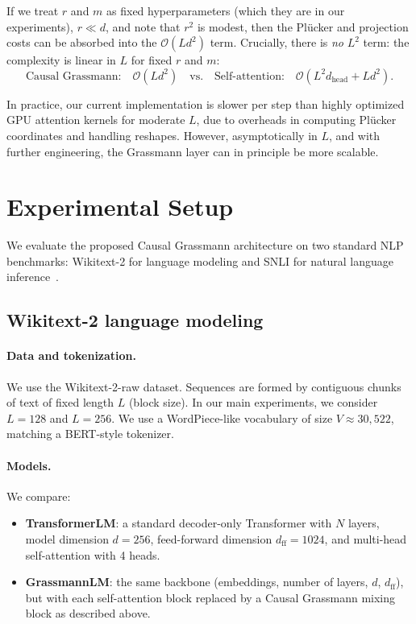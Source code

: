 \documentclass[11pt]{article}
\begin{document}
If we treat $r$ and $m$ as fixed hyperparameters (which they are in our experiments), $r \ll d$, and note that $r^2$ is modest, then the Pl\"ucker and projection costs can be absorbed into the $\mathcal{O}(L d^2)$ term. Crucially, there is \emph{no} $L^2$ term: the complexity is linear in $L$ for fixed $r$ and $m$:
\[
\text{Causal Grassmann:}\quad \mathcal{O}(L d^2) \quad \text{vs.} \quad \text{Self-attention:} \quad \mathcal{O}(L^2 d_{\text{head}} + L d^2).
\]

In practice, our current implementation is slower per step than highly optimized GPU attention kernels for moderate $L$, due to overheads in computing Pl\"ucker coordinates and handling reshapes. However, asymptotically in $L$, and with further engineering, the Grassmann layer can in principle be more scalable.

\section{Experimental Setup}

We evaluate the proposed Causal Grassmann architecture on two standard NLP benchmarks: Wikitext-2 for language modeling and SNLI for natural language inference~\cite{merity2016pointer,bowman2015snli}.

\subsection{Wikitext-2 language modeling}

\paragraph{Data and tokenization.}
We use the Wikitext-2-raw dataset. Sequences are formed by contiguous chunks of text of fixed length $L$ (block size). In our main experiments, we consider $L = 128$ and $L = 256$. We use a WordPiece-like vocabulary of size $V \approx 30{,}522$, matching a BERT-style tokenizer.

\paragraph{Models.}
We compare:

\begin{itemize}
    \item \textbf{TransformerLM}: a standard decoder-only Transformer with $N$ layers, model dimension $d=256$, feed-forward dimension $d_{\text{ff}}=1024$, and multi-head self-attention with 4 heads.
    \item \textbf{GrassmannLM}: the same backbone (embeddings, number of layers, $d$, $d_{\text{ff}}$), but with each self-attention block replaced by a Causal Grassmann mixing block as described above.
\end{itemize}
\end{document}
